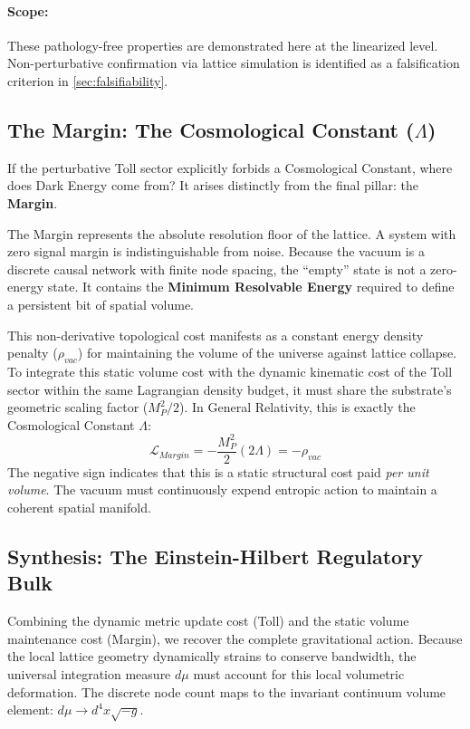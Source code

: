\paragraph{Scope:} These pathology-free properties are demonstrated here at the linearized level.  Non-perturbative confirmation via lattice simulation is identified as a falsification criterion in \cref{sec:falsifiability}.

\subsection{The Margin: The Cosmological Constant (\texorpdfstring{$\Lambda$}{Lambda})}
If the perturbative Toll sector explicitly forbids a Cosmological Constant, where does Dark Energy come from? It arises distinctly from the final pillar: the \textbf{Margin}.

The Margin represents the absolute resolution floor of the lattice. A system with zero signal margin is indistinguishable from noise. Because the vacuum is a discrete causal network with finite node spacing, the ``empty'' state is not a zero-energy state. It contains the \textbf{Minimum Resolvable Energy} required to define a persistent bit of spatial volume.

This non-derivative topological cost manifests as a constant energy density penalty ($\rho_{vac}$) for maintaining the volume of the universe against lattice collapse. To integrate this static volume cost with the dynamic kinematic cost of the Toll sector within the same Lagrangian density budget, it must share the substrate's geometric scaling factor ($M_P^2/2$). In General Relativity, this is exactly the Cosmological Constant $\Lambda$:
\begin{equation}
    \mathcal{L}_{Margin} = -\frac{M_P^2}{2}(2\Lambda) = -\rho_{vac}
\end{equation}
The negative sign indicates that this is a static structural cost paid \textit{per unit volume}. The vacuum must continuously expend entropic action to maintain a coherent spatial manifold.

\subsection{Synthesis: The Einstein-Hilbert Regulatory Bulk}
Combining the dynamic metric update cost (Toll) and the static volume maintenance cost (Margin), we recover the complete gravitational action. Because the local lattice geometry dynamically strains to conserve bandwidth, the universal integration measure $d\mu$ must account for this local volumetric deformation. The discrete node count maps to the invariant continuum volume element: $d\mu \to d^4x \sqrt{-g}$.

